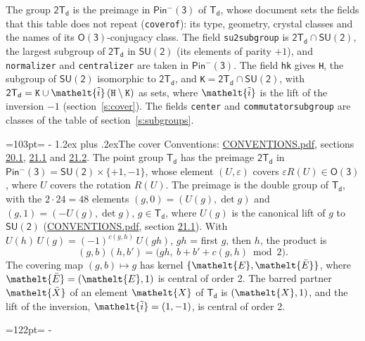 \documentclass[10pt,a4paper]{article}
\makeatletter
\renewcommand\section{\@startsection{section}{1}{\z@}{-3ex plus -1ex minus -.2ex}%
  {1.2ex plus .2ex}{\normalfont\large\sffamily\bfseries\color{parttitle}}}
\newcommand{\needspace}[1]{\par\penalty-100\begingroup\dimen0=#1\relax\dimen2=\pagegoal
  \advance\dimen2-\pagetotal\ifdim\dimen0>\dimen2\relax\ifdim\dimen2>0pt\vfil\break\fi\fi
  \endgroup}
\numberwithin{equation}{section}
\newcommand{\eltfont}[1]{{\let\sigma\eltsigma\mathelt{#1}}}
\newcommand{\grp}[1]{\mathsf{#1}}
\newcommand{\elt}[1]{\eltfont{#1}}
\newcommand{\dirprod}{\times}
\newcommand{\barred}[1]{\bar{#1}}
\newcommand{\lift}[1]{\tilde{#1}}
\makeatother
\begin{document}
\leavevmode\label{n:element.inversion}\label{n:group.preimage}The group $\grp{2T_{d}}$ is the preimage in $\grp{Pin^{-}(3)}$ of \href{../../../rotation/data/pdf/Td.pdf}{$\grp{T_{d}}$}, whose document sets the fields that this table does not repeat (\texttt{coverof}): its type, geometry, crystal classes and the names of its \href{../../../rotation/data/pdf/O3.pdf}{$\grp{O(3)}$}-conjugacy class. The field \texttt{su2subgroup} is $\grp{2T_{d}} \cap \grp{SU(2)}$, the largest subgroup of $\grp{2T_{d}}$ in $\grp{SU(2)}$ (its elements of parity $+1$), and \texttt{normalizer} and \texttt{centralizer} are taken in $\grp{Pin^{-}(3)}$. The field \texttt{hk} gives \texttt{H}, the subgroup of $\grp{SU(2)}$ isomorphic to $\grp{2T_{d}}$, and \texttt{K}${} = \grp{2T_{d}} \cap \grp{SU(2)}$, with $\grp{2T_{d}} = \texttt{K} \cup \elt{\lift{i}}\,(\texttt{H} \setminus \texttt{K})$ as sets, where $\elt{\lift{i}}$ is the lift of the inversion $-1$ (section~\ref{s:cover}). The fields \texttt{center} and \texttt{commutatorsubgroup} are classes of the table of section~\ref{s:subgroups}.
\needspace{103pt}
\section{The cover}\label{s:cover}
Conventions: \href{../../CONVENTIONS.pdf}{CONVENTIONS.pdf}, sections \href{../../CONVENTIONS.pdf\#conv.20.1}{20.1}, \href{../../CONVENTIONS.pdf\#conv.21.1}{21.1} and \href{../../CONVENTIONS.pdf\#conv.21.2}{21.2}.
\leavevmode\label{n:group.pin.minus}\label{n:group.su2}\label{n:local.pin.sign}\label{n:matrix.covered}\label{n:matrix.lift.su2}\label{n:index.bar}The point group $\grp{T_{d}}$ has the preimage $\grp{2T_{d}}$ in $\grp{Pin^{-}(3)} = \grp{SU(2)} \dirprod \{+1, -1\}$, whose element $(U, \varepsilon)$ covers $\varepsilon R(U) \in \grp{O(3)}$, where $U$ covers the rotation $R(U)$. The preimage is the double group of $\grp{T_{d}}$, with the $2 \cdot 24 = 48$ elements $(g, 0) = (U(g), \det g)$ and $(g, 1) = (-U(g), \det g)$, $g \in \grp{T_{d}}$, where $U(g)$ is the canonical lift of $g$ to $\grp{SU(2)}$ (\href{../../CONVENTIONS.pdf}{CONVENTIONS.pdf}, section \href{../../CONVENTIONS.pdf\#conv.21.1}{21.1}). \label{n:function.cocycle}With $U(h)\,U(g) = (-1)^{c(g,h)}\,U(gh)$, $gh$ = first $g$, then $h$, the product is
\begin{equation}\label{e:product}(g, b)(h, b') = \bigl(gh,\ b + b' + c(g, h) \bmod 2\bigr).\end{equation}
\leavevmode\label{n:mark.bar}The covering map $(g, b) \mapsto g$ has kernel $\{\elt{E}, \elt{\barred{E}}\}$, where $\elt{\barred{E}} = (\elt{E}, 1)$ is central of order 2. \label{n:element.named}\label{n:mark.lift}The barred partner $\elt{\barred{X}}$ of an element $\elt{X}$ of $\grp{T_{d}}$ is $(\elt{X}, 1)$, and the lift of the inversion, $\elt{\lift{i}} = (1, -1)$, is central of order 2.
\needspace{122pt}
\end{document}
